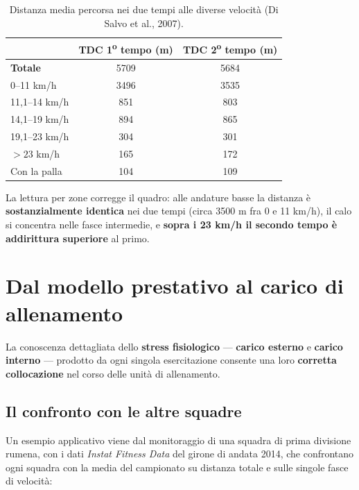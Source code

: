 \begin{table}[htbp]
  \centering
  \small
  \renewcommand{\arraystretch}{1.3}
  \begin{tabularx}{\textwidth}{|X|c|c|}
    \hline
    & \textbf{TDC 1\textsuperscript{o} tempo (m)} & \textbf{TDC 2\textsuperscript{o} tempo (m)} \\
    \hline
    \textbf{Totale} & 5709 & 5684 \\
    \hline
    0--11 km/h & 3496 & 3535 \\
    \hline
    11,1--14 km/h & 851 & 803 \\
    \hline
    14,1--19 km/h & 894 & 865 \\
    \hline
    19,1--23 km/h & 304 & 301 \\
    \hline
    $> 23$ km/h & 165 & 172 \\
    \hline
    Con la palla & 104 & 109 \\
    \hline
  \end{tabularx}
  \caption*{Distanza media percorsa nei due tempi alle diverse velocità (Di Salvo et al., 2007).}
\end{table}

La lettura per zone corregge il quadro: alle andature basse la distanza è \textbf{sostanzialmente
identica} nei due tempi (circa 3500 m fra 0 e 11 km/h), il calo si concentra nelle fasce
intermedie, e \textbf{sopra i 23 km/h il secondo tempo è addirittura superiore} al primo.

\section{Dal modello prestativo al carico di allenamento}

La conoscenza dettagliata dello \textbf{stress fisiologico} --- \textbf{carico esterno} e
\textbf{carico interno} --- prodotto da ogni singola esercitazione consente una loro
\textbf{corretta collocazione} nel corso delle unità di allenamento.

\subsection{Il confronto con le altre squadre}

Un esempio applicativo viene dal monitoraggio di una squadra di prima divisione rumena, con i dati
\textit{Instat Fitness Data} del girone di andata 2014, che confrontano ogni squadra con la media
del campionato su distanza totale e sulle singole fasce di velocità:

